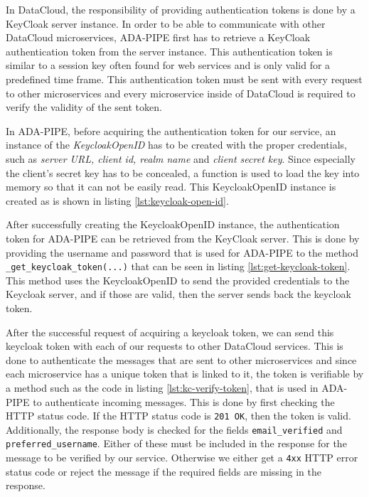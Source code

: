 \documentclass{article}
\begin{document}
            In DataCloud, the responsibility of providing authentication tokens is done by a KeyCloak server instance.
            In order to be able to communicate with other DataCloud microservices, ADA-PIPE first has to retrieve a KeyCloak authentication token from the server instance. This authentication token is similar to a session key often found for web services and is only valid for a predefined time frame. This authentication token must be sent with every request to other microservices and every microservice inside of DataCloud is required to verify the validity of the sent token.

            In ADA-PIPE, before acquiring the authentication token for our service, an instance of the \emph{KeycloakOpenID} has to be created with the proper credentials, such as \emph{server URL, client id, realm name} and \emph{client secret key}. Since especially the client's secret key has to be concealed, a function is used to load the key into memory so that it can not be easily read. This KeycloakOpenID instance is created as is shown in listing \ref{lst:keycloak-open-id}.
            
            
            After successfully creating the KeycloakOpenID instance, the authentication token for ADA-PIPE can be retrieved from the KeyCloak server. This is done by providing the username and password that is used for ADA-PIPE to the method \texttt{\_get\_keycloak\_token(...)} that can be seen in listing \ref{lst:get-keycloak-token}. This method uses the KeycloakOpenID to send the provided credentials to the Keycloak server, and if those are valid, then the server sends back the keycloak token.
            
            
            After the successful request of acquiring a keycloak token, we can send this keycloak token with each of our requests to other DataCloud services. This is done to authenticate the messages that are sent to other microservices and since each microservice has a unique token that is linked to it, the token is verifiable by a method such as the code in listing \ref{lst:kc-verify-token}, that is used in ADA-PIPE to authenticate incoming messages. This is done by first checking the HTTP status code. If the HTTP status code is \texttt{201 OK}, then the token is valid. Additionally, the response body is checked for the fields \texttt{email\_verified} and \texttt{preferred\_username}. Either of these must be included in the response for the message to be verified by our service. Otherwise we either get a \texttt{4xx} HTTP error status code or reject the message if the required fields are missing in the response.
\end{document}

